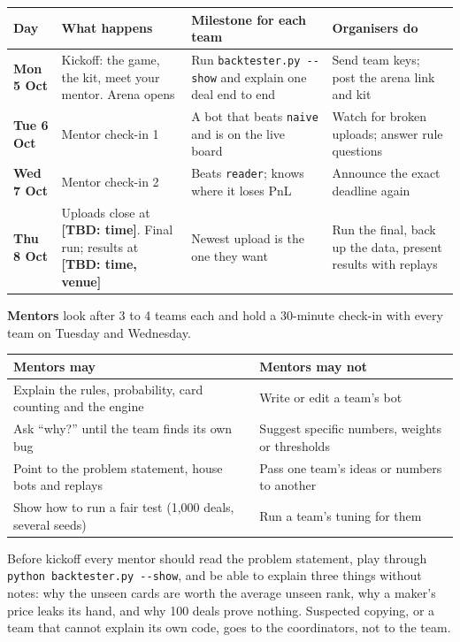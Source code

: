 \documentclass[11pt,a4paper]{article}
\newcommand{\TBD}[1]{\textcolor{tbd}{\textbf{[TBD: #1]}}}
\newcommand{\code}[1]{\texttt{#1}}
\begin{document}
\begin{center}
\begin{tabularx}{\linewidth}{@{}>{\bfseries}l L L L@{}}
\toprule
\textbf{Day} & \textbf{What happens} & \textbf{Milestone for each team} & \textbf{Organisers do} \\
\midrule
Mon 5 Oct & Kickoff: the game, the kit, meet your mentor. Arena opens & Run
  \code{backtester.py -{}-show} and explain one deal end to end & Send team keys; post the arena
  link and kit \\
Tue 6 Oct & Mentor check-in 1 & A bot that beats \code{naive} and is on the live board &
  Watch for broken uploads; answer rule questions \\
Wed 7 Oct & Mentor check-in 2 & Beats \code{reader}; knows where it loses PnL & Announce the
  exact deadline again \\
Thu 8 Oct & Uploads close at \TBD{time}. Final run; results at \TBD{time, venue} & Newest
  upload is the one they want & Run the final, back up the data, present results with replays \\
\bottomrule
\end{tabularx}
\end{center}

\textbf{Mentors} look after 3 to 4 teams each and hold a 30-minute check-in with every team on
Tuesday and Wednesday.

\begin{center}
\begin{tabularx}{\linewidth}{@{}LL@{}}
\toprule
\textbf{Mentors may} & \textbf{Mentors may not} \\
\midrule
Explain the rules, probability, card counting and the engine & Write or edit a team's bot \\
Ask ``why?'' until the team finds its own bug & Suggest specific numbers, weights or thresholds \\
Point to the problem statement, house bots and replays & Pass one team's ideas or numbers to another \\
Show how to run a fair test (1,000 deals, several seeds) & Run a team's tuning for them \\
\bottomrule
\end{tabularx}
\end{center}

Before kickoff every mentor should read the problem statement, play through
\code{python backtester.py -{}-show}, and be able to explain three things without notes: why the
unseen cards are worth the average unseen rank, why a maker's price leaks its hand, and why 100
deals prove nothing. Suspected copying, or a team that cannot explain its own code, goes to the
coordinators, not to the team.
\end{document}
